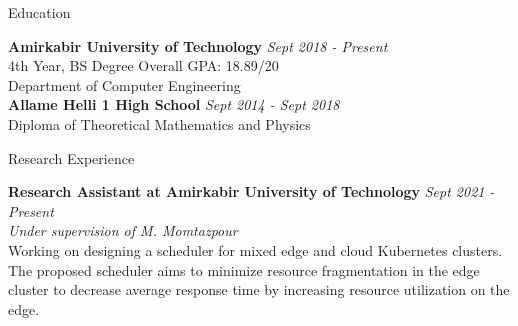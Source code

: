 \documentclass{resume} %
\begin{document}

\begin{rSection}{Education}

    {\bf Amirkabir University of Technology} \hfill {\em Sept 2018 - Present} 
    \\ 4th Year, BS Degree \hfill { Overall GPA: 18.89/20}
    \\ Department of Computer Engineering
    \vspace{2mm}\\
    {\bf Allame Helli 1 High School} \hfill {\em Sept 2014 - Sept 2018} 
    \\ Diploma of Theoretical Mathematics and Physics


\end{rSection}
\begin{rSection}{Research Experience}

    {\bf Research Assistant at Amirkabir University of Technology} \hfill {\em Sept 2021 - Present}\\
    {\em Under supervision of M. Momtazpour}
    \vspace{2mm}\\
    Working on designing a scheduler for mixed edge and cloud Kubernetes clusters. The proposed scheduler aims to minimize resource fragmentation in the edge cluster to decrease average response time by increasing resource utilization on the edge.
\end{rSection}
\end{document}
